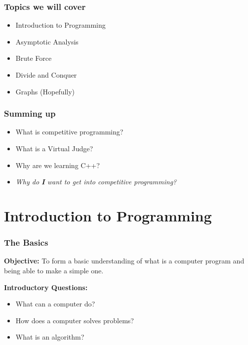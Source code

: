 \documentclass{beamer}
\begin{document}
\begin{frame}
	\frametitle{Topics we will cover}

	\begin{itemize}
		\item Introduction to Programming
		\item Asymptotic Analysis
		\item Brute Force
		\item Divide and Conquer
		\item Graphs (Hopefully)
	\end{itemize}
\end{frame}

\begin{frame}
	\frametitle{Summing up}

	\begin{itemize}
		\item What is competitive programming?
		\item What is a Virtual Judge?
		\item Why are we learning C++?
		\item \emph{Why do \textbf{I} want to get into competitive programming?}
	\end{itemize}
\end{frame}

\section{Introduction to Programming}

\begin{frame}
	\frametitle{The Basics}

	\textbf{Objective:} To form a basic understanding of what is a computer program and being able to make a simple one.

	\textbf{Introductory Questions:}
	\begin{itemize}
		\item What can a computer do?
		\item How does a computer solves problems?
		\item What is an algorithm?
	\end{itemize}
\end{frame}
\end{document}
